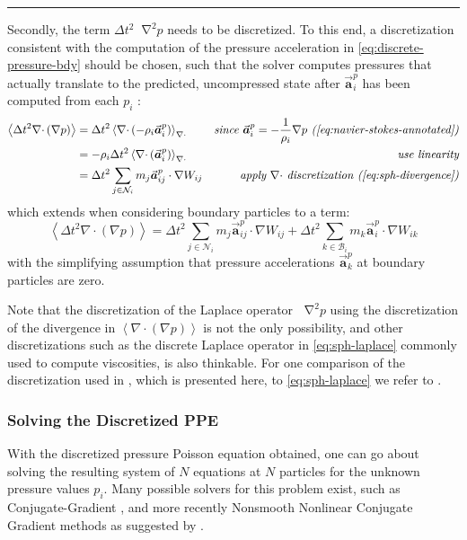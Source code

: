 \documentclass[oneside, a4paper]{book}
\newcommand\horizontalspacer[0]{\vspace{5pt}\noindent\textcolor{lightgray}{\rule{\textwidth}{1mm}}
\vspace{5pt}}
\newcommand\angled[1]{\left\langle#1\right\rangle}
\newcommand*\Laplace{\mathop{}\!\mathbin\nabla^2}
\newcommand\vek[1]{\vec{\bm{#1}}}
\newcommand\br[1]{\left(#1\right)}
\newcommand\divergence{{\nabla\cdot}}
\begin{document}
    \horizontalspacer

    Secondly, the term $\Delta t^2\Laplace p$ needs to be discretized. To this end, a discretization consistent with the computation of the pressure acceleration in \autoref{eq:discrete-pressure-bdy} should be chosen, such that the solver computes pressures that actually translate to the predicted, uncompressed state after $\vek{a}_i^p$ has been computed from each $p_i$ \autocite{tutorial2019}:
    \begin{align}
      \angled{\Delta t^2\divergence\br{\nabla p}} &= \Delta t^2\angled{\divergence\br{-\rho_i \vek{a}_i^p}}_\divergence &\textit{since $ \vek{a}_i^p=-\frac{1}{\rho_i}\nabla p$ (\autoref{eq:navier-stokes-annotated})}\\
      &= - \rho_i \Delta t^2\angled{\divergence\br{\vek{a}_i^p}}_\divergence&\textit{use linearity}\\
      &= 
      \Delta t^2 \sum_{j\in\mathcal{N}_i} m_j \vek{a}^p_{ij} \cdot \nabla W_{ij}
      &\textit{apply $\divergence$ discretization (\autoref{eq:sph-divergence})}
    \end{align}
    which extends when considering boundary particles to a term:
    \begin{equation}
      \angled{\Delta t^2\divergence\br{\nabla p}} =
      \Delta t^2 \sum_{j\in\mathcal{N}_i} m_j \vek{a}^p_{ij} \cdot \nabla W_{ij}
      +\Delta t^2 \sum_{k\in\mathcal{B}_i} m_k \vek{a}^p_{i} \cdot \nabla W_{ik}\label{eq:iisph-ap_i}
    \end{equation}
    with the simplifying assumption that pressure accelerations $\vek{a}^p_k$ at boundary particles are zero. 
    
    Note that the discretization of the Laplace operator $\Laplace p$ using the discretization of the divergence in $\angled{\divergence\br{\nabla p}}$ is not the only possibility, and other discretizations such as the discrete Laplace operator in \autoref{eq:sph-laplace} commonly used to compute viscosities, is also thinkable. For one comparison of the discretization used in \autocite[Implicit Incompressible SPH]{iisph}, which is presented here, to \autoref{eq:sph-laplace} we refer to \autocite[Fürstenau et al.]{fuerstenau-laplace-discretization-comparison}.
    
    \subsubsection{Solving the Discretized PPE}\label{sec:iisph}
    With the discretized pressure Poisson equation obtained, one can go about solving the resulting system of $N$ equations at $N$ particles for the unknown pressure values $p_i$. Many possible solvers for this problem exist, such as Conjugate-Gradient \autocite[as alternatively proposed by Ihmsen et al.]{iisph}, and more recently Nonsmooth Nonlinear Conjugate Gradient methods as suggested by \autocite[Probst and Teschner]{monolithic-rigids-timo}.
\end{document}
